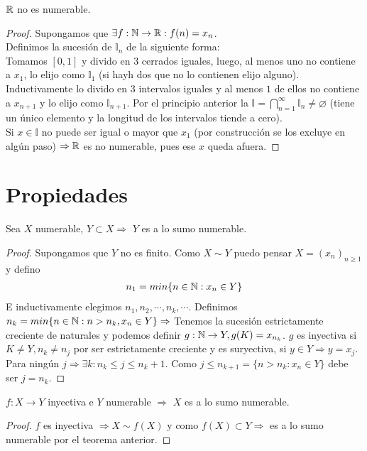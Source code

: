 \begin{theorem}
    $\mathbb{R}$  no es numerable.
    \begin{proof}
        Supongamos que $\exists f:\mathbb{N} \to \mathbb{R} : f(n) = x_n$. \\
        Definimos la sucesión de $\mathbb{I}_n$ de la siguiente forma: \\
        Tomamos $[0, 1]$ y divido en $3$ cerrados iguales, luego, al menos uno no contiene a $x_1$, lo elijo como $\mathbb{I}_1$ (si hayh dos que no lo contienen elijo alguno). Inductivamente lo divido en $3$ intervalos iguales y al menos $1$ de ellos no contiene a $x_{n+1}$ y lo elijo como $\mathbb{I}_{n+1}$. Por el principio anterior la $\mathbb{I} = \bigcap_{n=1}^\infty \mathbb{I}_n \neq \varnothing$ (tiene un único elemento y la longitud de los intervalos tiende a cero). \\
        Si $x \in \mathbb{I}$ no puede ser igual o mayor que $x_1$ (por construcción se los excluye en algún paso) $\Rightarrow \mathbb{R}$ es no numerable, pues ese $x$ queda afuera.
    \end{proof}
\end{theorem}

\section{Propiedades}

\begin{theorem}
    Sea $X$ numerable, $Y \subset X \Rightarrow$ $Y$ es a lo sumo numerable.
    \begin{proof}
        Supongamos que $Y$ no es finito. Como $X \sim Y$ puedo pensar $X = (x_n)_{n\geq1}$ y defino
        \begin{align*}
            n_1=min\{ n \in \mathbb{N}: x_n \in Y \}
        \end{align*}
        E inductivamente elegimos $n_1, n_2, \cdots , n_k, \cdots$. Definimos $n_k = min\{ n \in \mathbb{N} : n > n_k, x_n \in Y \} \Rightarrow$ Tenemos la sucesión estrictamente creciente de naturales y podemos definir $g: \mathbb{N} \to Y, g(K) = x_{n_k}$. $g$ es inyectiva si $K\neq Y, n_k \neq n_j$ por ser estrictamente creciente y es suryectiva, si $y \in Y \Rightarrow y = x_j$. Para ningún $j \Rightarrow \exists k :n_k\leq j \leq n_k+1$. Como $j \leq n_{k+1}=\{ n>n_k:x_n \in Y \}$ debe ser $j = n_k$.
    \end{proof}
\end{theorem}

\begin{corollary}
    $f: X \to Y$ inyectiva e $Y$ numerable $\Rightarrow$ $X$ es a lo sumo numerable.
    \begin{proof}
        $f$ es inyectiva $\Rightarrow X \sim f(X)$ y como $f(X) \subset Y \Rightarrow$ es a lo sumo numerable por el teorema anterior.
    \end{proof}
\end{corollary}

